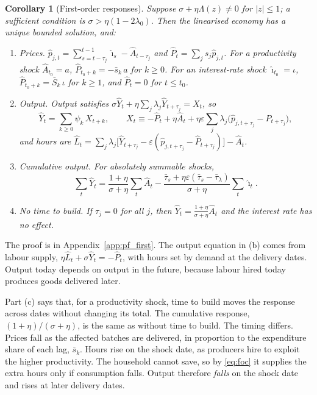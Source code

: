 \documentclass[11pt]{article}
\newtheorem{corollary}{Corollary}
\theoremstyle{definition}
\begin{document}
\begin{corollary}[First-order responses]\label{cor:first}
Suppose $\sigma+\eta\Lambda(z)\neq0$ for $|z|\le1$; a sufficient condition is
$\sigma>\eta(1-2\lambda_0)$. Then the linearised economy has a unique bounded solution, and:
\begin{enumerate}
  \item[(a)] \emph{Prices.} $\hat p_{j,t}=\sum_{s=t-\tau_j}^{t-1}\hat\imath_s-\hat A_{t-\tau_j}$ and
        $\hat P_t=\sum_js_j\hat p_{j,t}$. For a productivity shock $\hat A_{t_0}=a$,
        $\hat P_{t_0+k}=-\bar s_k\,a$ for $k\ge0$. For an interest-rate shock $\hat\imath_{t_0}=\iota$,
        $\hat P_{t_0+k}=\bar S_k\,\iota$ for $k\ge1$, and $\hat P_t=0$ for $t\le t_0$.
  \item[(b)] \emph{Output.} Output satisfies
        $\sigma\hat Y_t+\eta\sum_j\lambda_j\hat Y_{t+\tau_j}=X_t$, so
        \begin{equation}\label{eq:Yfirst}
          \hat Y_t=\sum_{k\ge0}\psi_k\,X_{t+k},\qquad
          X_t\equiv-\hat P_t+\eta\hat A_t+\eta\varepsilon\sum_j\lambda_j\bigl(\hat p_{j,t+\tau_j}-\hat P_{t+\tau_j}\bigr),
        \end{equation}
        and hours are
        $\hat L_t=\sum_j\lambda_j\bigl[\hat Y_{t+\tau_j}-\varepsilon(\hat p_{j,t+\tau_j}-\hat P_{t+\tau_j})\bigr]-\hat A_t$.
  \item[(c)] \emph{Cumulative output.} For absolutely summable shocks,
        \begin{equation}\label{eq:cum}
          \sum_t\hat Y_t=\frac{1+\eta}{\sigma+\eta}\sum_t\hat A_t
          -\frac{\bar\tau_s+\eta\varepsilon(\bar\tau_s-\bar\tau_\lambda)}{\sigma+\eta}\sum_t\hat\imath_t .
        \end{equation}
  \item[(d)] \emph{No time to build.} If $\tau_j=0$ for all $j$, then
        $\hat Y_t=\frac{1+\eta}{\sigma+\eta}\hat A_t$ and the interest rate has no effect.
\end{enumerate}
\end{corollary}

\noindent The proof is in Appendix~\ref{app:pf_first}. The output equation in (b) comes from labour supply,
$\eta\hat L_t+\sigma\hat Y_t=-\hat P_t$, with hours set by demand at the delivery dates. Output
today depends on output in the future, because labour hired today produces goods delivered later.

Part (c) says that, for a productivity shock, time to build moves the response across dates without
changing its total. The cumulative response, $(1+\eta)/(\sigma+\eta)$, is the same as without time
to build. The timing differs. Prices fall as the affected batches are delivered, in proportion to
the expenditure share of each lag, $\bar s_k$. Hours rise on the shock date, as producers hire to
exploit the higher productivity. The household cannot save, so by \eqref{eq:foc} it supplies the
extra hours only if consumption falls. Output therefore \emph{falls} on the shock date and rises at
later delivery dates.
\end{document}
